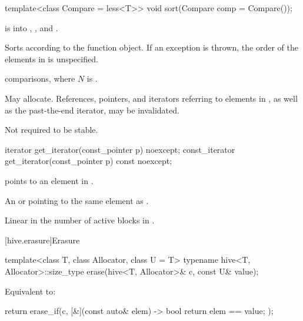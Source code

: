 %
\begin{itemdecl}
template<class Compare = less<T>>
  void sort(Compare comp = Compare());
\end{itemdecl}

\begin{itemdescr}
\pnum
\expects
{} is  into ,
, and .

\pnum
\effects
Sorts  according to the  function object.
If an exception is thrown,
the order of the elements in  is unspecified.

\pnum
\complexity
{} comparisons, where $N$ is .

\pnum
\remarks
May allocate.
References, pointers, and iterators referring to elements in ,
as well as the past-the-end iterator, may be invalidated.
\begin{note}
Not required to be stable.
\end{note}
\end{itemdescr}

%
\begin{itemdecl}
iterator get_iterator(const_pointer p) noexcept;
const_iterator get_iterator(const_pointer p) const noexcept;
\end{itemdecl}

\begin{itemdescr}
\pnum
\expects
{} points to an element in .

\pnum
\returns
An  or 
pointing to the same element as .

\pnum
\complexity
Linear in the number of active blocks in .
\end{itemdescr}

[hive.erasure]{Erasure}

%
\begin{itemdecl}
template<class T, class Allocator, class U = T>
  typename hive<T, Allocator>::size_type
    erase(hive<T, Allocator>& c, const U& value);
\end{itemdecl}

\begin{itemdescr}
\pnum
\effects
Equivalent to:
\begin{codeblock}
return erase_if(c, [&](const auto& elem) -> bool { return elem == value; });
\end{codeblock}
\end{itemdescr}

